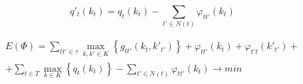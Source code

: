 \begin{equation*}
  q'_{t} \left( k_{t} \right) = q_{t}\left( k_{t} \right)
    - \sum_{t' \in N\left( t \right)} \varphi_{tt'} \left( k_{t} \right)
\end{equation*}

\begin{equation*}
  \begin{split}
    E\left( \Phi \right) =
      \sum_{tt' \in \tau} \max\limits_{k, k' \in K}{
        \left\{g_{tt'}\left( k_{t}, k'_{t'} \right)\right\} +
        \varphi_{tt'}\left( k_{t} \right) + \varphi_{t't}\left( k'_{t'} \right)
      } + \\ +
      \sum_{t \in T} \max\limits_{k \in K}{
        \left\{q_{t} \left( k_{t} \right)\right\} -
      \sum_{t' \in N\left( t \right)} \varphi_{tt'} \left( k_{t} \right)}
    \rightarrow min
  \end{split}
\end{equation*}

